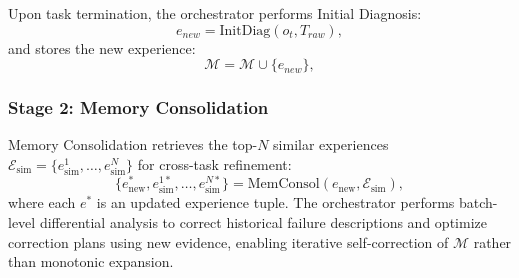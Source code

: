 Upon task termination, the {\color{black}orchestrator} performs Initial Diagnosis:
\begin{equation}
e_{new} = \text{InitDiag}(o_t, T_{raw}),
\end{equation}
and stores the new experience:
\begin{equation}
\mathcal{M} = \mathcal{M} \cup \{e_{new}\},
\end{equation}

\subsubsection{Stage 2: Memory Consolidation}

Memory Consolidation retrieves the top-$N$ similar experiences $\mathcal{E}_{\text{sim}} = \{e_{\text{sim}}^1, \dots, e_{\text{sim}}^N\}$ for cross-task refinement:
\begin{equation}
\{e_{\text{new}}^*, e_{\text{sim}}^{1*}, \dots, e_{\text{sim}}^{N*}\} = \text{MemConsol}(e_{\text{new}}, \mathcal{E}_{\text{sim}}),
\end{equation}
where each $e^*$ is an updated experience tuple.
The {\color{black}orchestrator} performs batch-level differential analysis to correct historical failure descriptions and optimize correction plans using new evidence, enabling iterative self-correction of $\mathcal{M}$ rather than monotonic expansion.
